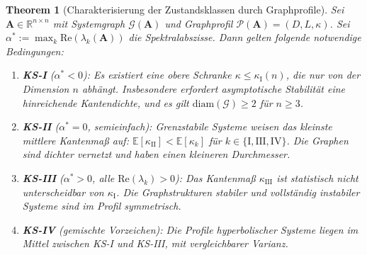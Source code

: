 \documentclass[a4paper, 12pt, twoside, openright]{report}
\newtheorem{theorem}{Theorem}[section]
\theoremstyle{definition}
\theoremstyle{definition}
\newcommand{\R}{\mathbb{R}}
\newcommand{\vA}{\bm{A}}
\newcommand{\re}{\mathrm{Re}}
\begin{document}
\begin{theorem}[Charakterisierung der Zustandsklassen durch Graphprofile]
\label{thm:ks_graphprofil}
Sei $\vA \in \R^{n \times n}$ mit Systemgraph $\mathcal{G}(\vA)$ und Graphprofil
$\mathcal{P}(\vA) = (D, L, \kappa)$. Sei $\alpha^* := \max_k \re(\lambda_k(\vA))$
die Spektralabszisse. Dann gelten folgende notwendige Bedingungen:
\begin{enumerate}[label=(\roman*)]
  \item \textbf{KS-I} ($\alpha^* < 0$): Es existiert eine obere Schranke
    $\kappa \leq \kappa_{\mathrm{I}}(n)$, die nur von der Dimension $n$ abhängt.
    Insbesondere erfordert asymptotische Stabilität eine hinreichende Kantendichte,
    und es gilt $\mathrm{diam}(\mathcal{G}) \geq 2$ für $n \geq 3$.
  \item \textbf{KS-II} ($\alpha^* = 0$, semieinfach): Grenzstabile Systeme weisen
    das kleinste mittlere Kantenmaß auf: $\mathbb{E}[\kappa_{\mathrm{II}}] <
    \mathbb{E}[\kappa_k]$ für $k \in \{\mathrm{I}, \mathrm{III}, \mathrm{IV}\}$.
    Die Graphen sind dichter vernetzt und haben einen kleineren Durchmesser.
  \item \textbf{KS-III} ($\alpha^* > 0$, alle $\re(\lambda_k) > 0$): Das Kantenmaß
    $\kappa_{\mathrm{III}}$ ist statistisch nicht unterscheidbar von $\kappa_{\mathrm{I}}$.
    Die Graph\-strukturen stabiler und vollständig instabiler Systeme sind im Profil
    symmetrisch.
  \item \textbf{KS-IV} (gemischte Vorzeichen): Die Profile hyperbolischer Systeme
    liegen im Mittel zwischen KS-I und KS-III, mit vergleichbarer Varianz.
\end{enumerate}
\end{theorem}
\end{document}
